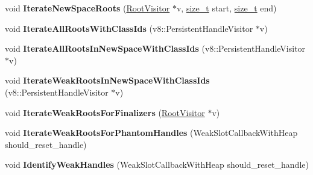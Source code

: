 \begin{DoxyCompactItemize}
\mbox{\label{classv8_1_1internal_1_1GlobalHandles_a7e9b3bb9f172aff643705a3fb1e84047}} 
void {\bfseries Iterate\+New\+Space\+Roots} (\mbox{\hyperlink{classv8_1_1internal_1_1RootVisitor}{Root\+Visitor}} $\ast$v, \mbox{\hyperlink{classsize__t}{size\+\_\+t}} start, \mbox{\hyperlink{classsize__t}{size\+\_\+t}} end)
\item 
\mbox{\label{classv8_1_1internal_1_1GlobalHandles_a835c15821ac609dabf258d235063ef3f}} 
void {\bfseries Iterate\+All\+Roots\+With\+Class\+Ids} (v8\+::\+Persistent\+Handle\+Visitor $\ast$v)
\item 
\mbox{\label{classv8_1_1internal_1_1GlobalHandles_a6ec43ecb7ce2ee26ba912d388825abcb}} 
void {\bfseries Iterate\+All\+Roots\+In\+New\+Space\+With\+Class\+Ids} (v8\+::\+Persistent\+Handle\+Visitor $\ast$v)
\item 
\mbox{\label{classv8_1_1internal_1_1GlobalHandles_a0d9ae6dad6cc9fd707d0b8b89897c38a}} 
void {\bfseries Iterate\+Weak\+Roots\+In\+New\+Space\+With\+Class\+Ids} (v8\+::\+Persistent\+Handle\+Visitor $\ast$v)
\item 
\mbox{\label{classv8_1_1internal_1_1GlobalHandles_aac057dd1698f7add74cdbe6b9ed72fe6}} 
void {\bfseries Iterate\+Weak\+Roots\+For\+Finalizers} (\mbox{\hyperlink{classv8_1_1internal_1_1RootVisitor}{Root\+Visitor}} $\ast$v)
\item 
\mbox{\label{classv8_1_1internal_1_1GlobalHandles_afa07f32c8258551fd4b82156c41f2e18}} 
void {\bfseries Iterate\+Weak\+Roots\+For\+Phantom\+Handles} (Weak\+Slot\+Callback\+With\+Heap should\+\_\+reset\+\_\+handle)
\item 
\mbox{\label{classv8_1_1internal_1_1GlobalHandles_a948a45895f46b33c7888f706f653093d}} 
void {\bfseries Identify\+Weak\+Handles} (Weak\+Slot\+Callback\+With\+Heap should\+\_\+reset\+\_\+handle)
\item 
\mbox{\label{classv8_1_1internal_1_1GlobalHandles_a6e531cd34702b56469b86312f2f526b3}} 

\end{DoxyCompactItemize}
